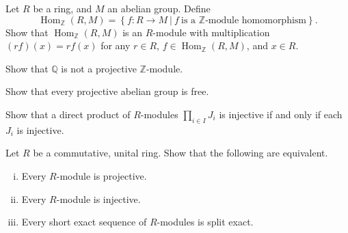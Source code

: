\documentclass{problemset}
\DeclareMathOperator{\Hom}{Hom}
\begin{document}
\begin{exercise} Let \(R\) be a ring, and \(M\) an abelian group.  Define \[\Hom _{\mathbb{Z}}(R,M)=\left\{f: R \rightarrow M\ |\ f\ \text{is a }\mathbb{Z}\text{-module homomorphism}\right\}.\]
Show that \(\Hom _{\mathbb{Z}}(R,M)\) is an \(R\)-module with multiplication \((rf)(x)=rf(x)\) for any \(r \in R\), \(f \in \Hom _{\mathbb{Z}}(R,M)\), and \(x \in R\).
\end{exercise}


\begin{exercise} Show that \(\mathbb{Q}\) is not a projective \(\mathbb{Z}\)-module.
\end{exercise}


\begin{exercise} Show that every projective abelian group is free.
\end{exercise}


\begin{exercise} Show that a direct product of \(R\)-modules \(\prod _{i \in I} J_i\)  is injective if and only if each \(J_i\) is injective.
\end{exercise}






\begin{exercise} Let \(R\) be a commutative, unital ring.  Show that the following are equivalent.
\begin{enumerate}[(i)]
\item Every \(R\)-module is projective.
\item Every \(R\)-module is injective.
\item Every short exact sequence of \(R\)-modules is split exact.
\end{enumerate}
\end{exercise}




\end{document}
